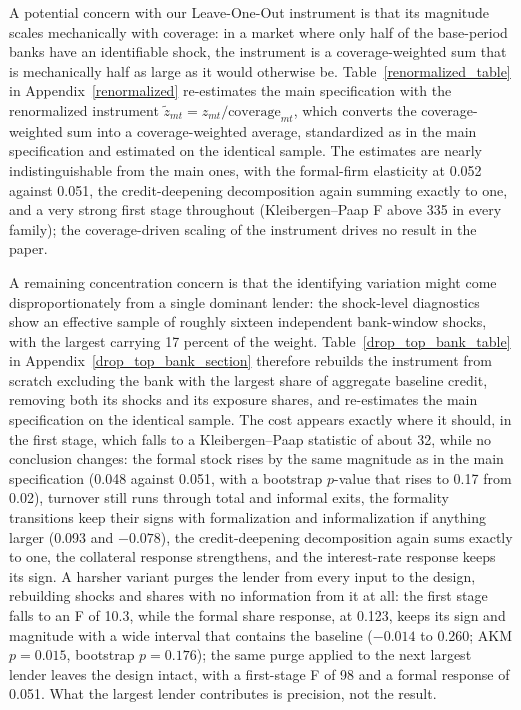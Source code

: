 \documentclass[12pt]{article}
\begin{document}
A potential concern with our Leave-One-Out instrument is that its magnitude scales mechanically with coverage: in a market where only half of the base-period banks have an identifiable shock, the instrument is a coverage-weighted sum that is mechanically half as large as it would otherwise be. Table~\ref{renormalized_table} in Appendix~\ref{renormalized} re-estimates the main specification with the renormalized instrument $\tilde z_{mt} = z_{mt}/\text{coverage}_{mt}$, which converts the coverage-weighted sum into a coverage-weighted average, standardized as in the main specification and estimated on the identical sample. The estimates are nearly indistinguishable from the main ones, with the formal-firm elasticity at 0.052 against 0.051, the credit-deepening decomposition again summing exactly to one, and a very strong first stage throughout (Kleibergen--Paap F above 335 in every family); the coverage-driven scaling of the instrument drives no result in the paper.

A remaining concentration concern is that the identifying variation might come disproportionately from a single dominant lender: the shock-level diagnostics show an effective sample of roughly sixteen independent bank-window shocks, with the largest carrying 17 percent of the weight. Table~\ref{drop_top_bank_table} in Appendix~\ref{drop_top_bank_section} therefore rebuilds the instrument from scratch excluding the bank with the largest share of aggregate baseline credit, removing both its shocks and its exposure shares, and re-estimates the main specification on the identical sample. The cost appears exactly where it should, in the first stage, which falls to a Kleibergen--Paap statistic of about 32, while no conclusion changes: the formal stock rises by the same magnitude as in the main specification (0.048 against 0.051, with a bootstrap $p$-value that rises to 0.17 from 0.02), turnover still runs through total and informal exits, the formality transitions keep their signs with formalization and informalization if anything larger (0.093 and $-0.078$), the credit-deepening decomposition again sums exactly to one, the collateral response strengthens, and the interest-rate response keeps its sign. A harsher variant purges the lender from every input to the design, rebuilding shocks and shares with no information from it at all: the first stage falls to an F of 10.3, while the formal share response, at 0.123, keeps its sign and magnitude with a wide interval that contains the baseline ($-0.014$ to 0.260; AKM $p = 0.015$, bootstrap $p = 0.176$); the same purge applied to the next largest lender leaves the design intact, with a first-stage F of 98 and a formal response of 0.051. What the largest lender contributes is precision, not the result.
\end{document}

